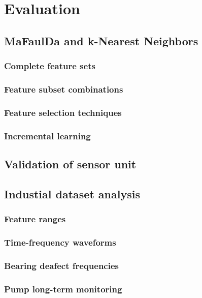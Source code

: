 \chapter{Evaluation} \label{section:evaluation} 


\section{MaFaulDa and k-Nearest Neighbors}

\subsection{Complete feature sets}



\subsection{Feature subset combinations}

\subsection{Feature selection techniques}

\subsection{Incremental learning}



\section{Validation of sensor unit}





\section{Industial dataset analysis}

\subsection{Feature ranges}

\subsection{Time-frequency waveforms}

\subsection{Bearing deafect frequencies}

\subsection{Pump long-term monitoring}


